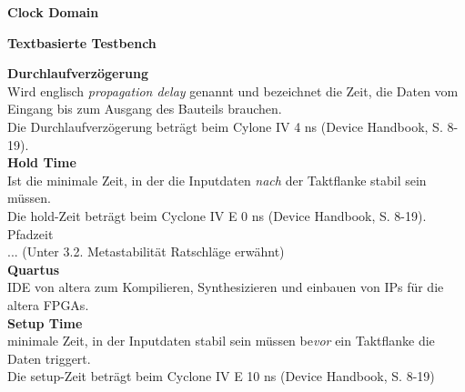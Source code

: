 \textbf{Clock Domain}


\textbf{Textbasierte Testbench}


\textbf{Durchlaufverzögerung}\\

Wird englisch \textit{propagation delay} genannt und bezeichnet die Zeit, die Daten vom Eingang bis zum Ausgang des Bauteils brauchen.\\
Die Durchlaufverzögerung beträgt beim Cylone IV 4 ns (Device Handbook, S. 8-19).\\


\textbf{Hold Time}\\
Ist die minimale Zeit, in der die Inputdaten \textit{nach} der Taktflanke stabil sein müssen.\\
Die hold-Zeit beträgt beim  Cyclone IV E 0 ns (Device Handbook, S. 8-19).\\


Pfadzeit\\
... (Unter 3.2. Metastabilität Ratschläge erwähnt)\\



\textbf{Quartus}\\
IDE von altera zum Kompilieren, Synthesizieren und einbauen von IPs für die altera FPGAs.\\


\textbf{Setup Time} \\
minimale Zeit, in der Inputdaten stabil sein müssen be\textit{vor} ein Taktflanke die Daten triggert.\\
Die setup-Zeit beträgt beim Cyclone IV E 10 ns (Device Handbook, S. 8-19)\\




